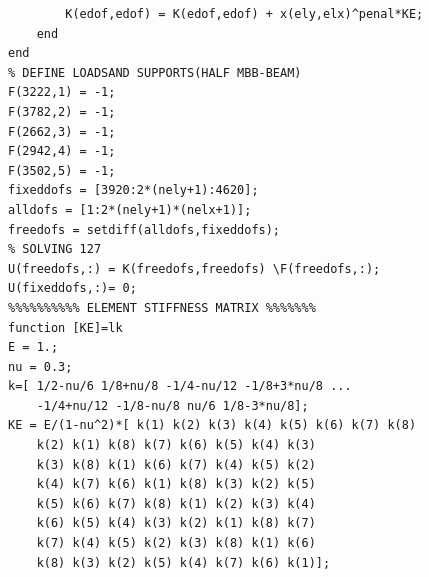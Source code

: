 \documentclass{article}
\begin{document}
\begin{lstlisting}
        K(edof,edof) = K(edof,edof) + x(ely,elx)^penal*KE;
    end
end
% DEFINE LOADSAND SUPPORTS(HALF MBB-BEAM)
F(3222,1) = -1;
F(3782,2) = -1;
F(2662,3) = -1;
F(2942,4) = -1;
F(3502,5) = -1;
fixeddofs = [3920:2*(nely+1):4620];
alldofs = [1:2*(nely+1)*(nelx+1)];
freedofs = setdiff(alldofs,fixeddofs);
% SOLVING 127
U(freedofs,:) = K(freedofs,freedofs) \F(freedofs,:);
U(fixeddofs,:)= 0;
%%%%%%%%%% ELEMENT STIFFNESS MATRIX %%%%%%%
function [KE]=lk
E = 1.;
nu = 0.3;
k=[ 1/2-nu/6 1/8+nu/8 -1/4-nu/12 -1/8+3*nu/8 ...
    -1/4+nu/12 -1/8-nu/8 nu/6 1/8-3*nu/8];
KE = E/(1-nu^2)*[ k(1) k(2) k(3) k(4) k(5) k(6) k(7) k(8)
    k(2) k(1) k(8) k(7) k(6) k(5) k(4) k(3)
    k(3) k(8) k(1) k(6) k(7) k(4) k(5) k(2)
    k(4) k(7) k(6) k(1) k(8) k(3) k(2) k(5)
    k(5) k(6) k(7) k(8) k(1) k(2) k(3) k(4)
    k(6) k(5) k(4) k(3) k(2) k(1) k(8) k(7)
    k(7) k(4) k(5) k(2) k(3) k(8) k(1) k(6)
    k(8) k(3) k(2) k(5) k(4) k(7) k(6) k(1)];
\end{lstlisting}
\newpage
\end{document}
